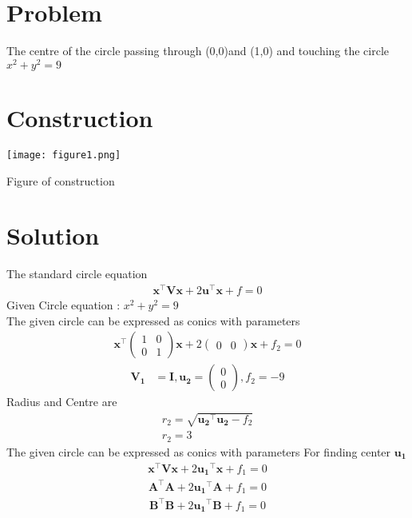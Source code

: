 \documentclass[10pt, a4paper]{article}
\title{\mytitle}
\author{\myauthor\hspace{1em}\\\contact\\FWC22058\hspace{6.5em}}
\newcommand{\myvec}[1]{\ensuremath{\begin{pmatrix}#1\end{pmatrix}}}
\let\vec\mathbf
\begin{document}
	\maketitle
	\tableofcontents
   \section{Problem}
   The centre of the circle passing through (0,0)and (1,0) and touching the circle
   $x^2+y^2=9$
\section{Construction}
  \texttt{[image: figure1.png]}
  	\begin{center}
  Figure of construction
  	\end{center}
  \section{Solution}
The standard circle equation\\
\begin{align}
\vec{x}^{\top}\vec{V}\vec{x}+2\vec{u}^{\top}\vec{x}+f=0
\end{align}
Given Circle equation : $x^2+y^2=9$\\
The given circle  can be expressed as conics with parameters
\begin{align}
\vec{x}^{\top}\myvec{1&0\\0&1}\vec{x}+2\myvec{0&0}\vec{x}+f_2=0
\end{align}
\begin{align}
	\vec{V_1} &= \vec{I}, \vec{u_2} = \myvec{0\\0}, f_2 = -9
	\end{align}
	Radius and Centre are
\begin{align}
r_2=\sqrt{{\vec{u_2}^{\top}\vec{u_2}}-f_2 }\\
{r_2}=3
\end{align}
The given circle  can be expressed as conics with parameters
For finding center $\vec{u_1}$
\begin{align}
\vec{x}^{\top}\vec{V}\vec{x}+2\vec{u_1}^{\top}\vec{x}+f_1=0
\end{align}
\begin{align}
    \vec{A}^{\top}\vec{A}+2\vec{u_1}^{\top}\vec{A}+f_1=0
    \end{align}
\begin{align}
\vec{B}^{\top}\vec{B}+2\vec{u_1}^{\top}\vec{B}+f_1=0
\end{align}
\end{document}
